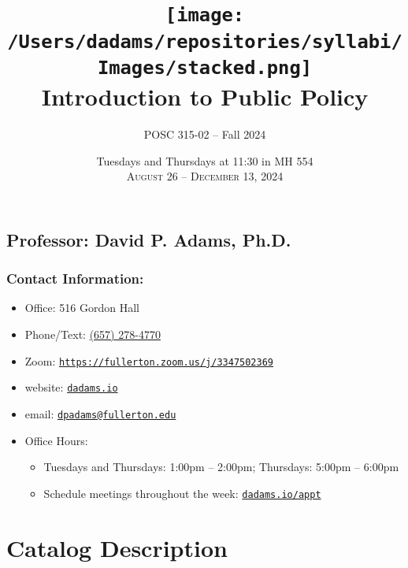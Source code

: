 \documentclass[12pt, letterpaper]{article}
\begin{document}
\title{\texttt{[image: /Users/dadams/repositories/syllabi/Images/stacked.png]} \\\vspace{1ex} \textbf{Introduction to Public Policy}}

\author{POSC 315-02 -- Fall 2024}
\date{Tuesdays and Thursdays at 11:30 in MH 554 \\\vspace{2ex} \textsc{August 26 -- December 13, 2024}}

    \maketitle


\subsection*{Professor: David P. Adams, Ph.D.}

\subsubsection*{Contact Information:}

\begin{itemize}
	\item Office: 516 Gordon Hall
	\item Phone/Text: \href{tel:+16572784770}{(657) 278-4770}
	\item Zoom: \href{https://fullerton.zoom.us/j/3347502369}{\texttt{https://fullerton.zoom.us/j/3347502369}}
	\item website: \href{https://dadams.io}{\texttt{dadams.io}}
	\item email: \href{dpadams@fullerton.edu}{\texttt{dpadams@fullerton.edu}}
	\item Office Hours:
        \begin{itemize}
            \item Tuesdays and Thursdays: 1:00pm -- 2:00pm; Thursdays: 5:00pm -- 6:00pm
            \item Schedule meetings throughout the week: \href{https://dadams.io/appt}{\texttt{dadams.io/appt}}
        \end{itemize}  
\end{itemize}


\section{Catalog Description}
\end{document}
